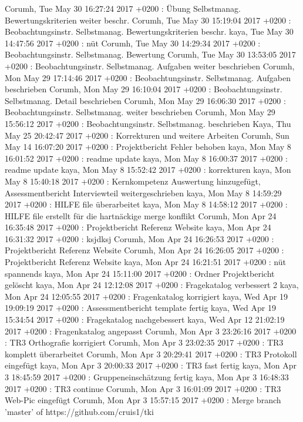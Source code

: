 Corumh, Tue May 30 16:27:24 2017 +0200 : Übung Selbstmanag. Bewertungskriterien weiter beschr.
Corumh, Tue May 30 15:19:04 2017 +0200 : Beobachtungsinstr. Selbstmanag. Bewertungskriterien beschr.
kaya, Tue May 30 14:47:56 2017 +0200 : nüt
Corumh, Tue May 30 14:29:34 2017 +0200 : Beobachtungsinstr. Selbstmanag. Bewertung
Corumh, Tue May 30 13:53:05 2017 +0200 : Beobachtungsinstr. Selbstmanag. Aufgaben weiter beschrieben
Corumh, Mon May 29 17:14:46 2017 +0200 : Beobachtungsinstr. Selbstmanag. Aufgaben beschrieben
Corumh, Mon May 29 16:10:04 2017 +0200 : Beobachtungsinstr. Selbstmanag. Detail beschrieben
Corumh, Mon May 29 16:06:30 2017 +0200 : Beobachtungsinstr. Selbstmanag. weiter beschrieben
Corumh, Mon May 29 15:56:12 2017 +0200 : Beobachtungsinstr. Selbstmanag. beschrieben
Kaya, Thu May 25 20:42:47 2017 +0200 : Korrekturen und weitere Arbeiten
Corumh, Sun May 14 16:07:20 2017 +0200 : Projektbericht Fehler behoben
kaya, Mon May 8 16:01:52 2017 +0200 : readme update
kaya, Mon May 8 16:00:37 2017 +0200 : readme update
kaya, Mon May 8 15:52:42 2017 +0200 : korrekturen
kaya, Mon May 8 15:40:18 2017 +0200 : Kernkompetenz Auswertung hinzugefügt, Assessmentbericht Interviewteil weitergeschrieben
kaya, Mon May 8 14:59:29 2017 +0200 : HILFE file überarbeitet
kaya, Mon May 8 14:58:12 2017 +0200 : HILFE file erstellt für die hartnäckige merge konflikt
Corumh, Mon Apr 24 16:35:48 2017 +0200 : Projektbericht Referenz Website
kaya, Mon Apr 24 16:31:32 2017 +0200 : ksjdksj
Corumh, Mon Apr 24 16:26:53 2017 +0200 : Projektbericht Referenz Website
Corumh, Mon Apr 24 16:26:05 2017 +0200 : Projektbericht Referenz Website
kaya, Mon Apr 24 16:21:51 2017 +0200 : nüt spannends
kaya, Mon Apr 24 15:11:00 2017 +0200 : Ordner Projektbericht gelöscht
kaya, Mon Apr 24 12:12:08 2017 +0200 : Fragekatalog verbessert 2
kaya, Mon Apr 24 12:05:55 2017 +0200 : Fragenkatalog korrigiert
kaya, Wed Apr 19 19:09:19 2017 +0200 : Assessmentbericht template fertig
kaya, Wed Apr 19 15:34:54 2017 +0200 : Fragekatalog nachgebessert
kaya, Wed Apr 12 21:02:19 2017 +0200 : Fragenkatalog angepasst
Corumh, Mon Apr 3 23:26:16 2017 +0200 : TR3 Orthografie korrigiert
Corumh, Mon Apr 3 23:02:35 2017 +0200 : TR3 komplett überarbeitet
Corumh, Mon Apr 3 20:29:41 2017 +0200 : TR3 Protokoll eingefügt
kaya, Mon Apr 3 20:00:33 2017 +0200 : TR3 fast fertig
kaya, Mon Apr 3 18:45:59 2017 +0200 : Gruppeneinschätzung fertig
kaya, Mon Apr 3 16:48:33 2017 +0200 : TR3 continue
Corumh, Mon Apr 3 16:01:09 2017 +0200 : TR3 Web-Pic eingefügt
Corumh, Mon Apr 3 15:57:15 2017 +0200 : Merge branch 'master' of https://github.com/cruis1/tki
